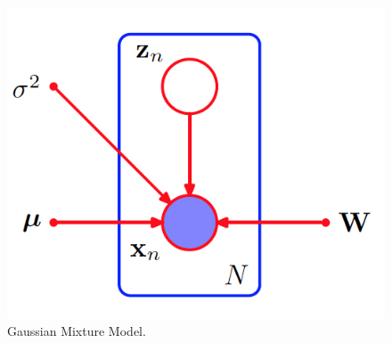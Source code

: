 \documentclass[12pt,twoside]{article}
\begin{document}
\begin{figure}[H]
\begin{center}
\includegraphics[width = 0.4\hsize]{./figures/PPCA.png} %
\caption{Gaussian Mixture Model.} %
\label{fig:PPCA} %
\end{center}
\end{figure}
\end{document}
